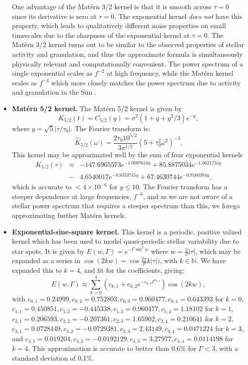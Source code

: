 \documentclass[manuscript, letterpaper]{aastex6}
\begin{document}
\begin{itemize}
One advantage of the Mat\'ern 3/2 kernel is that it is smooth across
$\tau=0$ since its derivative is zero at $\tau=0$.  The exponential kernel {\it does not}
have this property, which leads to qualitatively different noise properties on small
timescales due to the sharpness of the exponential kernel at $\tau=0$.  The Mat\'ern 3/2 kernel
turns out to be similar to the observed properties of stellar activity and granulation, and thus the approximate
formula is simultaneously physically relevant and computationally convenient.
The power spectrum of a single exponential scales as $f^{-2}$ at high frequency,
while the Mat\'ern kernel scales as $f^{-4}$ which more closely matches the power
spectrum due to activity and granulation in the Sun \citep{2004A&A...414.1139A,2009A&A...495..979M}.
\item {\bf Mat\'ern 5/2 kernel.}  The Mat\'ern 5/2 kernel is given by
\begin{equation}
K_{5/2}(t) = C_{5/2}(y) = \sigma^2 (1+y+y^2/3)e^{-y},
\end{equation}
where $y = \sqrt{5}\vert \tau/\tau_0\vert$.  The Fourier transform is:
\begin{equation}
\hat K_{5/2}(\omega) = \frac{2\tau_0 10^{5/2}}{3\pi^{1/2}} (5+\tau_0^2\omega^2)^{-3}.
\end{equation}
This kernel may be approximated well by the sum of four exponential kernels
\begin{eqnarray}
K_{5/2}(\tau) &\approx& -147.6965573 e^{-1.0097610 y} + 85.8875034 e^{-1.0621734 y}\\
 &-&4.6540017 e^{-0.8353745 y} + 67.4630744 e^{-0.9160394 y},
\end{eqnarray}
which is accurate to $<4\times 10^{-6}$ for $y \le 10$.
The Fourier transform has a steeper dependence at large frequencies, $f^{-6}$, and as we are not aware of a stellar
power spectrum that requires a steeper spectrum than this, we forego approximating further Mat\'ern kernels.
\item {\bf Exponential-sine-square kernel.}  This kernel is a periodic, positive valued kernel
which has been used to model quasi-periodic stellar variability due to star spots.   It is
given by $E(w,\Gamma) = e^{-\Gamma \sin^2{w}}$ where $w = \frac{\pi}{P}\vert \tau \vert$, which may be
expanded as a series in $\cos{(2kw)} = \cos{\frac{2\pi}{P} k \vert \tau \vert)}$,
with $k \in \mathbb{N}$.  We have expanded this to $k=4$, and fit for the coefficients, giving:
\begin{equation}
E(w,\Gamma) \approx \sum_{k=0}^4 \left(c_{k,1}+c_{k,2} e^{-c_{k,4}\Gamma^{c_{k,3}}}\right) \cos{(2kw)},
\end{equation}
with $c_{0,1}=0.24999, c_{0,2}=0.752803, c_{0,3}=0.960477, c_{0,4}=0.643393$ for $k=0$,
$c_{1,1}=0.450851, c_{1,2}=-0.445338, c_{1,3}=0.960477, c_{1,4}= 1.18102$ for $k=1$,
$c_{2,1}=0.206593, c_{2,2}=-0.207361, c_{2,3}=1.65902, c_{2,4}= 0.210641$ for $k=2$,
$c_{3,1}=0.0728449, c_{3,2}=-0.0729381, c_{3,3}=2.43149, c_{3,4}= 0.0471224$ for $k=3$, and
$c_{4,1}=0.019204, c_{4,2}=-0.0192129, c_{4,3}=3.27977, c_{4,4}= 0.0114198$ for $k=4$.
This approximation is accurate to better than 0.6\% for $\Gamma < 3$, with a standard
deviation of 0.1\%.
\end{itemize}
\end{document}
